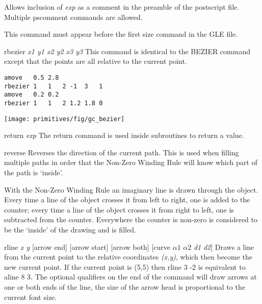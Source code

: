 \begin{commanddescription}
Allows inclusion of {\it exp} as a comment in the preamble of the postscript file.  Multiple {\sf pscomment} commands are allowed.

This command must appear before the first {\sf size} command in the GLE file.

\item[{\sf rbezier {\it x1 y1 x2 y2 x3 y3}}]
 
This command is identical to the BEZIER command except that the points are
all relative to the current point.

\begin{minipage}[c]{8cm}
\begin{Verbatim}
amove   0.5 2.8 
rbezier 1   1   2 -1  3   1
amove   0.2 0.2 
rbezier 1   1   2 1.2 1.8 0
\end{Verbatim}
\end{minipage}
\hfill
\begin{minipage}[c]{7cm}
\mbox{\texttt{[image: primitives/fig/gc\_bezier]}}
\end{minipage}

\item[{\sf return} {\it exp}]
The {\sf return} command is used inside subroutines to return a value.

\item[{\sf reverse }]
Reverses the direction of the current path.  This is used when filling
multiple paths in order that the Non-Zero Winding Rule will know which
part of the path is `inside'.

With the Non-Zero Winding Rule an imaginary line is drawn through the
object. Every time a line of the object crosses it from left to
right, one is added to the counter; every time a line of the object
crosses it from right to left, one is subtracted from the counter. Everywhere
the counter is non-zero is considered to be the `inside' of the drawing and
is filled.


\item[{\sf rline {\it x y} [arrow end] [arrow start] [arrow both] [curve {\it $\alpha1$} {\it $\alpha2$} {\it d1} {\it d2}]}]
Draws a line from the current point to the relative coordinates {\it (x,y)},
which then become the new current point.  If the current point is (5,5) then
{\sf rline 3 -2} is equivalent to {\sf aline 8 3}.  The optional
qualifiers on the end of the command will draw arrows at one or both
ends of the line,  the size of the arrow head is proportional to the current
font size.


\end{commanddescription}
